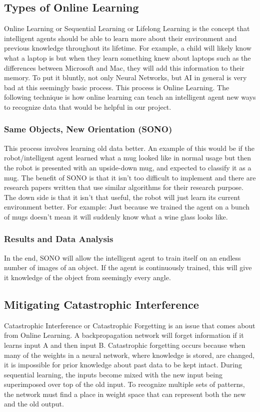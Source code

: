 \documentclass[draftclsnofoot, onecolumn, 10pt, compsoc]{IEEEtran}
\begin{document}
		\subsection{Types of Online Learning}
			Online Learning or Sequential Learning or Lifelong Learning is the concept that intelligent agents should be able to learn more about their environment and previous knowledge throughout its lifetime. For example, a child will likely know what a laptop is but when they learn something knew about laptops such as the differences between Microsoft and Mac, they will add this information to their memory. To put it bluntly, not only Neural Networks, but AI in general is very bad at this seemingly basic process. This process is Online Learning. The following technique is how online learning can teach an intelligent agent new ways to recognize data that would be helpful in our project.
			
			\subsubsection{Same Objects, New Orientation (SONO)}
				This process involves learning old data better. An example of this would be if the robot/intelligent agent learned what a mug looked like in normal usage but then the robot is presented with an upside-down mug, and expected to classify it as a mug. The benefit of SONO is that it isn’t too difficult to implement and there are research papers written that use similar algorithms for their research purpose. The down side is that it isn’t that useful, the robot will just learn its current environment better. For example: Just because we trained the agent on a bunch of mugs doesn’t mean it will suddenly know what a wine glass looks like.
			
			\subsubsection{Results and Data Analysis}
				In the end, SONO will allow the intelligent agent to train itself on an endless number of images of an object. If the agent is continuously trained, this will give it knowledge of the object from seemingly every angle. 
		
		\subsection{Mitigating Catastrophic Interference}
			Catastrophic Interference or Catastrophic Forgetting is an issue that comes about from Online Learning. A backpropagation network will forget information if it learns input A and then input B. Catastrophic forgetting occurs because when many of the weights in a neural network, where knowledge is stored, are changed, it is impossible for prior knowledge about past data to be kept intact. During sequential learning, the inputs become mixed with the new input being superimposed over top of the old input. To recognize multiple sets of patterns, the network must find a place in weight space that can represent both the new and the old output. 
		
\end{document}
